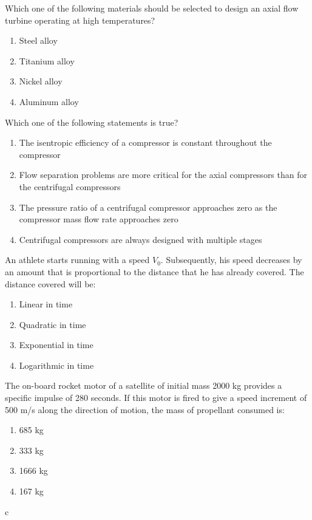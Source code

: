     \item Which one of the following materials should be selected to design an axial flow turbine operating at high temperatures?
    \begin{enumerate}
        \item Steel alloy
        \item Titanium alloy
        \item Nickel alloy
        \item Aluminum alloy
    \end{enumerate}

    \item Which one of the following statements is true?
    \begin{enumerate}
        \item The isentropic efficiency of a compressor is constant throughout the compressor
        \item Flow separation problems are more critical for the axial compressors than for the centrifugal compressors
        \item The pressure ratio of a centrifugal compressor approaches zero as the compressor mass flow rate approaches zero
        \item Centrifugal compressors are always designed with multiple stages
    \end{enumerate}

    \item An athlete starts running with a speed $V_0$. Subsequently, his speed decreases by an amount that is proportional to the distance that he has already covered. The distance covered will be:
    \begin{enumerate}
        \item Linear in time
        \item Quadratic in time
        \item Exponential in time
        \item Logarithmic in time
    \end{enumerate}

    \item The on-board rocket motor of a satellite of initial mass 2000 kg provides a specific impulse of 280 seconds. If this motor is fired to give a speed increment of 500 m/s along the direction of motion, the mass of propellant consumed is:
    \begin{enumerate}
        \item 685 kg
        \item 333 kg
        \item 1666 kg
        \item 167 kg
    \end{enumerate}
c
